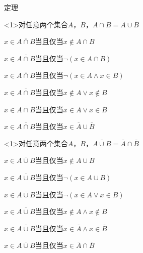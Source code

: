 \documentclass[xetex,10pt,aspectratio=43]{beamer}
\begin{document}
	\begin{frame}{定理}
		
		\begin{block}<1>{对任意两个集合$A$，$B$，$\overline{A\cap B}=\overline{A}\cup\overline{B}$}
			
			$x\in\overline{A\cap B}$当且仅当$x\notin A\cap B$
			
			$x\in\overline{A\cap B}$当且仅当$\lnot(x\in A\cap B)$
			
			$x\in\overline{A\cap B}$当且仅当$\lnot(x\in A\wedge x\in B)$
			
			$x\in\overline{A\cap B}$当且仅当$x\notin A\vee x\notin B$
			
			$x\in\overline{A\cap B}$当且仅当$x\in\overline{A}\vee x\in \overline{B}$
			
			$x\in\overline{A\cap B}$当且仅当$x\in\overline{A}\cup \overline{B}$
			
		\end{block}
	
		\begin{block}<1>{对任意两个集合$A$，$B$，$\overline{A\cup B}=\overline{A}\cap\overline{B}$}
			
			$x\in\overline{A\cup B}$当且仅当$x\notin A\cup B$
			
			$x\in\overline{A\cup B}$当且仅当$\lnot(x\in A\cup B)$
			
			$x\in\overline{A\cup B}$当且仅当$\lnot(x\in A\vee x\in B)$
			
			$x\in\overline{A\cup B}$当且仅当$x\notin A\wedge x\notin B$
			
			$x\in\overline{A\cup B}$当且仅当$x\in\overline{A}\wedge x\in\overline{B}$
			
			$x\in\overline{A\cup B}$当且仅当$x\in\overline{A}\cap\overline{B}$
			
		\end{block}
	
	\end{frame}
\end{document}
